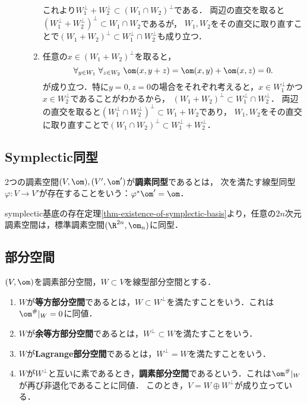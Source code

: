 \documentclass[uplatex,dvipdfmx]{jsreport}
\begin{document}
\begin{Proof}
\begin{description}
\begin{enumerate}[{Step}1]
            これより$W_1^\perp+W_2^\perp\subset(W_1\cap W_2)^\perp$である．
            両辺の直交を取ると$(W_1^\perp+W_2^\perp)^\perp\subset W_1\cap W_2$であるが，
            $W_1,W_2$をその直交に取り直すことで$(W_1+W_2)^\perp\subset W_1^\perp\cap W_2^\perp$も成り立つ．
            \item 任意の$x\in(W_1+W_2)^\perp$を取ると，
            \[\forall_{y\in W_1}\;\forall_{z\in W_2}\;\om(x,y+z)=\om(x,y)+\om(x,z)=0.\]
            が成り立つ．特に$y=0,z=0$の場合をそれぞれ考えると，$x\in W_1^\perp$かつ$x\in W_2^\perp$であることがわかるから，
            $(W_1+W_2)^\perp\subset W_1^\perp\cap W_2^\perp$．
            両辺の直交を取ると$(W^\perp_1\cap W^\perp_2)^\perp\subset W_1+W_2$であり，
            $W_1,W_2$をその直交に取り直すことで$(W_1\cap W_2)^\perp\subset W_1^\perp+W_2^\perp$．
        \end{enumerate}
    \end{description}
\end{Proof}

\subsection{Symplectic同型}

\begin{definition}
    2つの調素空間$(V,\om),(V',\om')$が\textbf{調素同型}であるとは，
    次を満たす線型同型$\varphi:V\to V'$が存在することをいう：$\varphi^*\om'=\om$．
\end{definition}
\begin{remarks}
    symplectic基底の存在定理\ref{thm-existence-of-symplectic-basis}より，任意の$2n$次元調素空間は，標準調素空間$(\R^{2n},\om_n)$に同型．
\end{remarks}

\subsection{部分空間}

\begin{definition}
    $(V,\om)$を調素部分空間，$W\subset V$を線型部分空間とする．
    \begin{enumerate}
        \item $W$が\textbf{等方部分空間}であるとは，$W\subset W^\perp$を満たすことをいう．これは$\om^\#|_W=0$に同値．
        \item $W$が\textbf{余等方部分空間}であるとは，$W^\perp\subset W$を満たすことをいう．
        \item $W$が\textbf{Lagrange部分空間}であるとは，$W^\perp=W$を満たすことをいう．
        \item $W$が$W^\perp$と互いに素であるとき，\textbf{調素部分空間}であるという．これは$\om^\#|_W$が再び非退化であることに同値．
        このとき，$V=W\oplus W^\perp$が成り立っている．
    \end{enumerate}
\end{definition}
\end{document}

